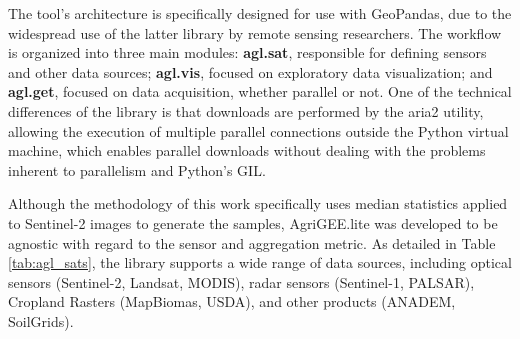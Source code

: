 The tool's architecture is specifically designed for use with GeoPandas, due to the widespread use of the latter library by remote sensing researchers. The workflow is organized into three main modules: \textbf{agl.sat}, responsible for defining sensors and other data sources; \textbf{agl.vis}, focused on exploratory data visualization; and \textbf{agl.get}, focused on data acquisition, whether parallel or not. One of the technical differences of the library is that downloads are performed by the aria2 utility, allowing the execution of multiple parallel connections outside the Python virtual machine, which enables parallel downloads without dealing with the problems inherent to parallelism and Python's GIL.

Although the methodology of this work specifically uses median statistics applied to Sentinel-2 images to generate the samples, AgriGEE.lite was developed to be agnostic with regard to the sensor and aggregation metric. As detailed in Table \ref{tab:agl_sats}, the library supports a wide range of data sources, including optical sensors (Sentinel-2, Landsat, MODIS), radar sensors (Sentinel-1, PALSAR), Cropland Rasters (MapBiomas, \ac{USDA}), and other products (ANADEM, SoilGrids).

